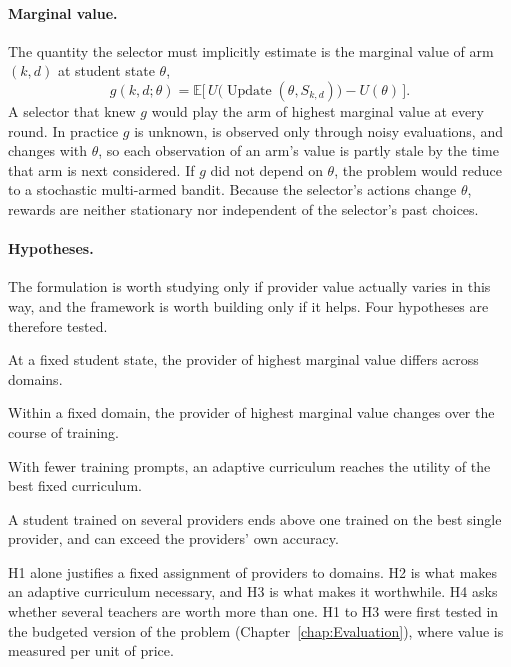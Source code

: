 \paragraph{Marginal value.} The quantity the selector must implicitly estimate is the
marginal value of arm $(k, d)$ at student state $\theta$,
\[
  g(k, d; \theta) =
  \mathbb{E}\big[\, U\big(\operatorname{Update}(\theta, S_{k,d})\big) - U(\theta) \,\big].
\]
A selector that knew $g$ would play the arm of highest marginal value at every round.
In practice $g$ is unknown, is observed only through noisy evaluations, and changes
with $\theta$, so each observation of an arm's value is partly stale by the time that
arm is next considered. If $g$ did not depend on $\theta$, the problem would reduce to
a stochastic multi-armed bandit. Because the selector's actions change $\theta$,
rewards are neither stationary nor independent of the selector's past choices.

\paragraph{Hypotheses.} The formulation is worth studying only if provider value
actually varies in this way, and the framework is worth building only if it helps.
Four hypotheses are therefore tested.

\begin{description}[itemsep=2pt,topsep=4pt]
  \item[H1 (Non-dominance).] At a fixed student state, the provider of highest
    marginal value differs across domains.
  \item[H2 (State dependence).] Within a fixed domain, the provider of highest
    marginal value changes over the course of training.
  \item[H3 (Adaptivity pays).] With fewer training prompts, an adaptive curriculum
    reaches the utility of the best fixed curriculum.
  \item[H4 (Passing the teachers).] A student trained on several providers ends
    above one trained on the best single provider, and can exceed the providers' own
    accuracy.
\end{description}

H1 alone justifies a fixed assignment of providers to domains. H2 is what makes an
adaptive curriculum necessary, and H3 is what makes it worthwhile. H4 asks whether
several teachers are worth more than one. H1 to H3 were first tested in the budgeted
version of the problem (Chapter~\ref{chap:Evaluation}), where value is measured per
unit of price.

